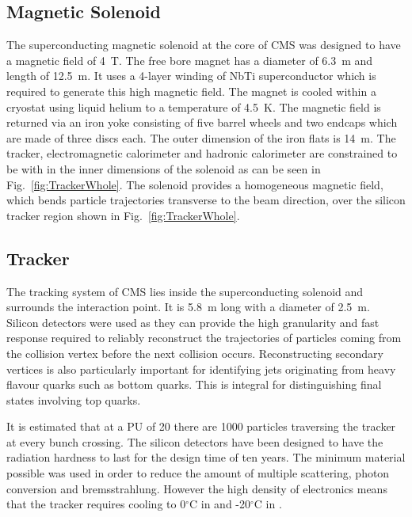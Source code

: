 \subsection{Magnetic Solenoid}

The superconducting magnetic solenoid at the core of CMS was designed to have a magnetic field of 4~T. The free bore magnet has a diameter of 6.3~m and length of 12.5~m. It uses a 4-layer winding of NbTi superconductor which is required to generate this high magnetic field. The magnet is cooled within a cryostat using liquid helium to a temperature of 4.5~K. The magnetic field is returned via an iron yoke consisting of five barrel wheels and two endcaps which are made of three discs each. The outer dimension of the iron flats is 14~m. The tracker, electromagnetic calorimeter and hadronic calorimeter are constrained to be with in the inner dimensions of the solenoid as can be seen in Fig.~\ref{fig:TrackerWhole}. The solenoid provides a homogeneous magnetic field, which bends particle trajectories transverse to the beam direction, over the silicon tracker region shown in Fig.~\ref{fig:TrackerWhole}.

\subsection{Tracker \label{sec:tracker}}

The tracking system of CMS lies inside the superconducting solenoid and surrounds the interaction point. It is 5.8~m long with a diameter of 2.5~m.
Silicon detectors were used as they can provide the high granularity and fast response required to reliably reconstruct the trajectories of particles coming from the collision vertex before the next collision occurs.
Reconstructing secondary vertices is also particularly important for identifying jets originating from heavy flavour quarks such as bottom quarks. This is integral for distinguishing final states involving top quarks.

It is estimated that at a PU of 20 there are 1000 particles traversing the tracker at every bunch crossing. The silicon detectors have been designed to have the radiation hardness to last for the design time of ten years. The minimum material possible was used in order to reduce the amount of multiple scattering, photon conversion and bremsstrahlung. However the high density of electronics means that the tracker requires cooling to 0$^{\circ}$C in \runone and -20$^{\circ}$C in \runtwo. %

